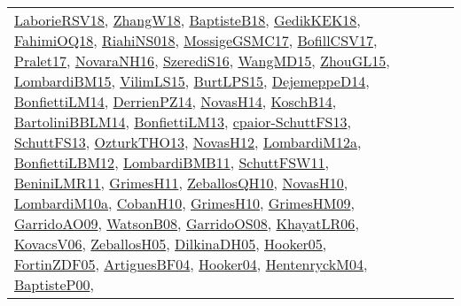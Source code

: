 {\begin{longtable}{lp{3cm}>{\raggedright}p{6cm}>{\raggedright}p{6cm}p{8cm}}
\href{articles/LaborieRSV18.pdf}{LaborieRSV18}\cite{LaborieRSV18}, \href{articles/ZhangW18.pdf}{ZhangW18}\cite{ZhangW18}, \href{articles/BaptisteB18.pdf}{BaptisteB18}\cite{BaptisteB18}, \href{articles/GedikKEK18.pdf}{GedikKEK18}\cite{GedikKEK18}, \href{articles/FahimiOQ18.pdf}{FahimiOQ18}\cite{FahimiOQ18}, \href{papers/RiahiNS018.pdf}{RiahiNS018}\cite{RiahiNS018}, \href{papers/MossigeGSMC17.pdf}{MossigeGSMC17}\cite{MossigeGSMC17}, \href{papers/BofillCSV17.pdf}{BofillCSV17}\cite{BofillCSV17}, \href{papers/Pralet17.pdf}{Pralet17}\cite{Pralet17}, \href{articles/NovaraNH16.pdf}{NovaraNH16}\cite{NovaraNH16}, \href{papers/SzerediS16.pdf}{SzerediS16}\cite{SzerediS16}, \href{articles/WangMD15.pdf}{WangMD15}\cite{WangMD15}, \href{papers/ZhouGL15.pdf}{ZhouGL15}\cite{ZhouGL15}, \href{papers/LombardiBM15.pdf}{LombardiBM15}\cite{LombardiBM15}, \href{papers/VilimLS15.pdf}{VilimLS15}\cite{VilimLS15}, \href{papers/BurtLPS15.pdf}{BurtLPS15}\cite{BurtLPS15}, \href{papers/DejemeppeD14.pdf}{DejemeppeD14}\cite{DejemeppeD14}, \href{papers/BonfiettiLM14.pdf}{BonfiettiLM14}\cite{BonfiettiLM14}, \href{papers/DerrienPZ14.pdf}{DerrienPZ14}\cite{DerrienPZ14}, \href{articles/NovasH14.pdf}{NovasH14}\cite{NovasH14}, \href{papers/KoschB14.pdf}{KoschB14}\cite{KoschB14}, \href{papers/BartoliniBBLM14.pdf}{BartoliniBBLM14}\cite{BartoliniBBLM14}, \href{papers/BonfiettiLM13.pdf}{BonfiettiLM13}\cite{BonfiettiLM13}, \href{papers/cpaior-SchuttFS13.pdf}{cpaior-SchuttFS13}\cite{cpaior-SchuttFS13}, \href{papers/SchuttFS13.pdf}{SchuttFS13}\cite{SchuttFS13}, \href{articles/OzturkTHO13.pdf}{OzturkTHO13}\cite{OzturkTHO13}, \href{articles/NovasH12.pdf}{NovasH12}\cite{NovasH12}, \href{articles/LombardiM12a.pdf}{LombardiM12a}\cite{LombardiM12a}, \href{papers/BonfiettiLBM12.pdf}{BonfiettiLBM12}\cite{BonfiettiLBM12}, \href{papers/LombardiBMB11.pdf}{LombardiBMB11}\cite{LombardiBMB11}, \href{articles/SchuttFSW11.pdf}{SchuttFSW11}\cite{SchuttFSW11}, \href{articles/BeniniLMR11.pdf}{BeniniLMR11}\cite{BeniniLMR11}, \href{papers/GrimesH11.pdf}{GrimesH11}\cite{GrimesH11}, \href{articles/ZeballosQH10.pdf}{ZeballosQH10}\cite{ZeballosQH10}, \href{articles/NovasH10.pdf}{NovasH10}\cite{NovasH10}, \href{articles/LombardiM10a.pdf}{LombardiM10a}\cite{LombardiM10a}, \href{papers/CobanH10.pdf}{CobanH10}\cite{CobanH10}, \href{papers/GrimesH10.pdf}{GrimesH10}\cite{GrimesH10}, \href{papers/GrimesHM09.pdf}{GrimesHM09}\cite{GrimesHM09}, \href{articles/GarridoAO09.pdf}{GarridoAO09}\cite{GarridoAO09}, \href{papers/WatsonB08.pdf}{WatsonB08}\cite{WatsonB08}, \href{articles/GarridoOS08.pdf}{GarridoOS08}\cite{GarridoOS08}, \href{articles/KhayatLR06.pdf}{KhayatLR06}\cite{KhayatLR06}, \href{papers/KovacsV06.pdf}{KovacsV06}\cite{KovacsV06}, \href{articles/ZeballosH05.pdf}{ZeballosH05}\cite{ZeballosH05}, \href{papers/DilkinaDH05.pdf}{DilkinaDH05}\cite{DilkinaDH05}, \href{articles/Hooker05.pdf}{Hooker05}\cite{Hooker05}, \href{papers/FortinZDF05.pdf}{FortinZDF05}\cite{FortinZDF05}, \href{papers/ArtiguesBF04.pdf}{ArtiguesBF04}\cite{ArtiguesBF04}, \href{papers/Hooker04.pdf}{Hooker04}\cite{Hooker04}, \href{papers/HentenryckM04.pdf}{HentenryckM04}\cite{HentenryckM04}, \href{articles/BaptisteP00.pdf}{BaptisteP00}\cite{BaptisteP00}, 
\end{longtable}}
